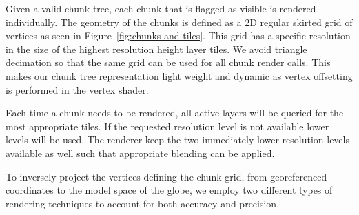 \documentclass[journal]{vgtc}                %
\newcommand{\alexcomment}[1]{\textbf{[-Alex-~}
    \textcolor{magenta}{#1}
    \textbf{~]}}
\newcommand{\plgrem}[1]{\textcolor{blue}{~\textbf{!!}~}}
\newcommand{\fig}[1]{Figure~\ref{fig:#1}}
\begin{document}
Given a valid chunk tree, each chunk that is flagged as visible is rendered individually.
The geometry of the chunks is defined as a 2D regular skirted grid of vertices as seen in \fig{chunks-and-tiles}. This grid has a specific resolution in the size of the highest resolution height layer tiles. We avoid triangle decimation so that the same grid can be used for all chunk render calls. This makes our chunk tree representation light weight and dynamic as vertex offsetting is performed in the vertex shader.

Each time a chunk needs to be rendered, all active layers will be queried for the most appropriate tiles.
If the requested resolution level is not available lower levels will be used.
The renderer keep the two immediately lower resolution levels available as well such that appropriate blending can be applied.



To inversely project the vertices defining the chunk grid, from georeferenced coordinates to the model space of the globe, we employ two different types of rendering techniques to account for both accuracy and precision.
\end{document}

